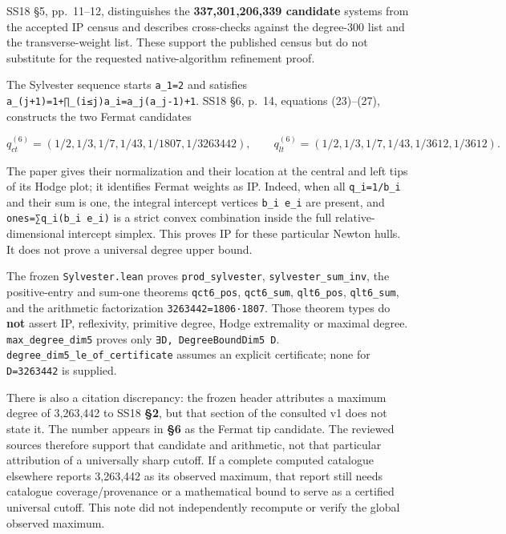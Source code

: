 \documentclass[11pt,a4paper,oneside]{report}
\begin{document}
SS18 §5, pp.~11--12, distinguishes the \textbf{337,301,206,339
candidate} systems from the accepted IP census and describes
cross-checks against the degree-300 list and the transverse-weight list.
These support the published census but do not substitute for the
requested native-algorithm refinement proof.

The Sylvester sequence starts \texttt{a\_\allowbreak{}1=\allowbreak{}2}
and satisfies
\texttt{a\_\allowbreak{}(\allowbreak{}j+1)\allowbreak{}=\allowbreak{}1+∏\_\allowbreak{}(\allowbreak{}i≤j)\allowbreak{}a\_\allowbreak{}i=\allowbreak{}a\_\allowbreak{}j(\allowbreak{}a\_\allowbreak{}j-\allowbreak{}1)\allowbreak{}+1}.
SS18 §6, p.~14, equations (23)--(27), constructs the two Fermat
candidates

\[
q_{ct}^{(6)}=(1/2,1/3,1/7,1/43,1/1807,1/3263442),
\qquad
q_{lt}^{(6)}=(1/2,1/3,1/7,1/43,1/3612,1/3612).
\]

The paper gives their normalization and their location at the central
and left tips of its Hodge plot; it identifies Fermat weights as IP.
Indeed, when all
\texttt{q\_\allowbreak{}i=\allowbreak{}1/\allowbreak{}b\_\allowbreak{}i}
and their sum is one, the integral intercept vertices
\texttt{b\_\allowbreak{}i e\_\allowbreak{}i} are present, and
\texttt{ones=\allowbreak{}∑q\_\allowbreak{}i(\allowbreak{}b\_\allowbreak{}i e\_\allowbreak{}i)}
is a strict convex combination inside the full relative-dimensional
intercept simplex. This proves IP for these particular Newton hulls. It
does not prove a universal degree upper bound.

The frozen \texttt{Sylveste\allowbreak{}r.\allowbreak{}lean} proves
\texttt{prod\_\allowbreak{}sylveste\allowbreak{}r},
\texttt{sylveste\allowbreak{}r\_\allowbreak{}sum\_\allowbreak{}inv}, the
positive-entry and sum-one theorems \texttt{qct6\_\allowbreak{}pos},
\texttt{qct6\_\allowbreak{}sum}, \texttt{qlt6\_\allowbreak{}pos},
\texttt{qlt6\_\allowbreak{}sum}, and the arithmetic factorization
\texttt{3263442=\allowbreak{}1806·1807}. Those theorem types do
\textbf{not} assert IP, reflexivity, primitive degree, Hodge extremality
or maximal degree. \texttt{max\_\allowbreak{}degree\_\allowbreak{}dim5}
proves only \texttt{∃D,\allowbreak{} DegreeBo\allowbreak{}undDim5 D}.
\texttt{degree\_\allowbreak{}dim5\_\allowbreak{}le\_\allowbreak{}of\_\allowbreak{}certific\allowbreak{}ate}
assumes an explicit certificate; none for
\texttt{D=\allowbreak{}3263442} is supplied.

There is also a citation discrepancy: the frozen header attributes a
maximum degree of 3,263,442 to SS18 \textbf{§2}, but that section of the
consulted v1 does not state it. The number appears in \textbf{§6} as the
Fermat tip candidate. The reviewed sources therefore support that
candidate and arithmetic, not that particular attribution of a
universally sharp cutoff. If a complete computed catalogue elsewhere
reports 3,263,442 as its observed maximum, that report still needs
catalogue coverage/provenance or a mathematical bound to serve as a
certified universal cutoff. This note did not independently recompute or
verify the global observed maximum.
\end{document}
